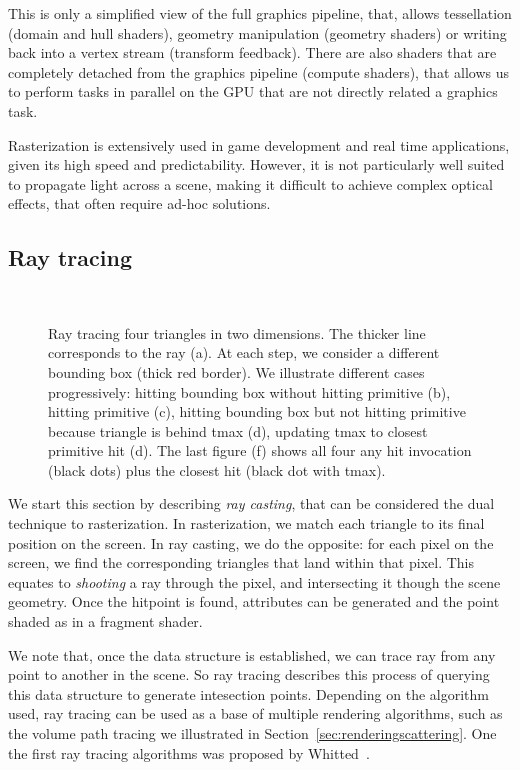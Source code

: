 This is only a simplified view of the full graphics pipeline, that, allows tessellation (domain and hull shaders), geometry manipulation (geometry shaders) or writing back into a vertex stream (transform feedback). There are also shaders that are completely detached from the graphics pipeline (compute shaders), that allows us to perform tasks in parallel on the GPU that are not directly related a graphics task. 

Rasterization is extensively used in game development and real time applications, given its high speed and predictability. However, it is not particularly well suited to propagate light across a scene, making it difficult to achieve complex optical effects, that often require ad-hoc solutions.

\subsection{Ray tracing}

\begin{figure}
\centering
   \def\svgwidth{\textwidth}
    \\
\caption{Ray tracing four triangles in two dimensions. The thicker line corresponds to the ray (a). At each step, we consider a different bounding box (thick red border). We illustrate different cases progressively: hitting bounding box without hitting primitive (b), hitting primitive (c), hitting bounding box but not hitting primitive because triangle is behind tmax (d), updating tmax to closest primitive hit (d). The last figure (f) shows all four any hit invocation (black dots) plus the closest hit (black dot with tmax).} 
\label{fig:ray_tracing}
\end{figure}

We start this section by describing \emph{ray casting}, that can be considered the dual technique to rasterization. In rasterization, we match each triangle to its final position on the screen. In ray casting, we do the opposite: for each pixel on the screen, we find the corresponding triangles that land within that pixel. This equates to \emph{shooting} a ray through the pixel, and intersecting it though the scene geometry. Once the hitpoint is found, attributes can be generated and the point shaded as in a fragment shader. 

We note that, once the data structure is established, we can trace ray from any point to another in the scene. So ray tracing describes this process of querying this data structure to generate intesection points. Depending on the algorithm used, ray tracing can be used as a base of multiple rendering algorithms, such as the volume path tracing we illustrated in Section~\ref{sec:renderingscattering}. One the first ray tracing algorithms was proposed by Whitted~\cite{Whitted1980}.

